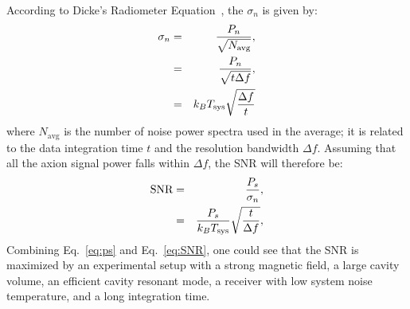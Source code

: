 According to Dicke's Radiometer Equation~\cite{Dicke}, the $\sigma_n$ 
is given by: 
\begin{eqnarray}
 \sigma_n  &=&  \frac{P_n}{\sqrt{N_\text{avg}}}, \nonumber \\
           &=&  \frac{P_n}{\sqrt{t\Delta f}}, \nonumber \\
           &=&  k_BT_\text{sys}\sqrt{\frac{\Delta f}{t}} 
 \label{eq:sigman}
\end{eqnarray}
where $N_\text{avg}$ is the number of noise power spectra used in the 
average; it is related to the data integration time $t$ 
and the resolution bandwidth $\Delta f$.  
Assuming that all the axion signal power falls within $\Delta f$, 
the SNR will therefore be: 
\begin{eqnarray}
   \text{SNR} & = & \frac{P_s}{\sigma_n}, \nonumber \\
              & = & \frac{P_s}{k_BT_\text{sys}}\sqrt{\frac{t}{\Delta f}},
 \label{eq:SNR}
\end{eqnarray}  
Combining Eq.~\eqref{eq:ps} and Eq.~\eqref{eq:SNR},
one could see that the SNR is maximized by an experimental setup with 
a strong magnetic field, a large cavity volume, an efficient cavity 
resonant mode, a receiver with low system noise temperature, and a 
long integration time. 










